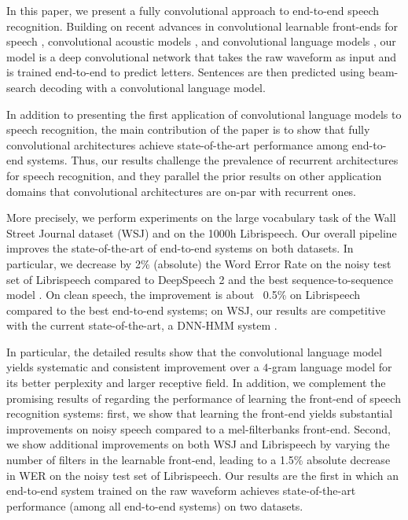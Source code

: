 \documentclass[a4paper]{article}
\begin{document}
In this paper, we present a fully convolutional approach to end-to-end speech recognition. Building on recent advances in convolutional learnable front-ends for speech \cite{tdfbanks1,tdfbanks2}, convolutional acoustic models \cite{wav2letter2}, and convolutional language models \cite{glu}, our model is a deep convolutional network that takes the raw waveform as input and is trained end-to-end to predict letters. Sentences are then predicted using beam-search decoding with a convolutional language model. 

In addition to presenting the first application of convolutional language models to speech recognition, the main contribution of the paper is to show that fully convolutional architectures achieve state-of-the-art performance among end-to-end systems. Thus, our results challenge the prevalence of recurrent architectures for speech recognition, and they parallel the prior results on other application domains that convolutional architectures are on-par with recurrent ones.

More precisely, we perform experiments on the large vocabulary task of the Wall Street Journal dataset (WSJ) and on the 1000h Librispeech. Our overall pipeline improves the state-of-the-art of end-to-end systems on both datasets. In particular, we decrease by 2\%  (absolute) the Word Error Rate on the noisy test set of Librispeech compared to DeepSpeech 2 \cite{deepspeech2} and the best sequence-to-sequence model \cite{improvedzeyer}. On clean speech, the improvement is about ~0.5\% 
on Librispeech compared to the best end-to-end systems; on WSJ, our results are competitive with the current state-of-the-art, a DNN-HMM system \cite{chan2015deep}. 

In particular, the detailed results show that the convolutional language model yields systematic and consistent improvement over a $4$-gram language model for its better perplexity and larger receptive field. In addition, we complement the promising results of \cite{tdfbanks2} regarding the performance of learning the front-end of speech recognition systems: first, we show that learning the front-end yields substantial improvements on noisy speech compared to a mel-filterbanks front-end. Second, we show additional improvements on both WSJ and Librispeech by varying the number of filters in the learnable front-end, leading to a 1.5\% absolute decrease in WER on the noisy test set of Librispeech. Our results are the first in which an end-to-end system trained on the raw waveform achieves state-of-the-art performance (among all end-to-end systems) on two datasets. 
\end{document}
